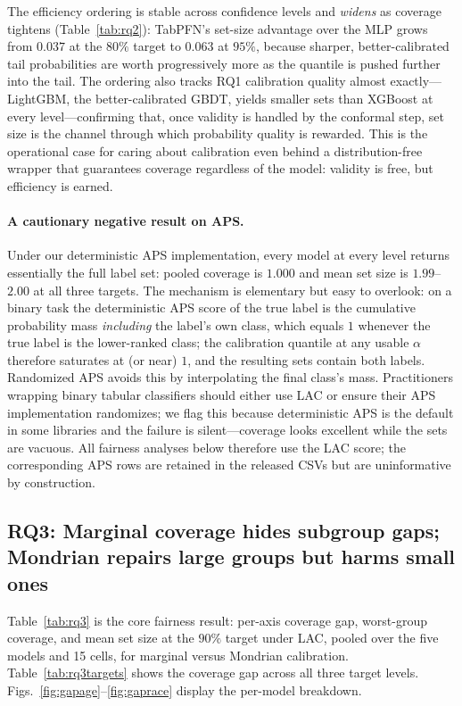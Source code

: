 \documentclass[review,12pt]{elsarticle}
\begin{document}
The efficiency ordering is stable across confidence levels and \emph{widens} as coverage tightens (Table~\ref{tab:rq2}): TabPFN's set-size advantage over the MLP grows from $0.037$ at the $80\%$ target to $0.063$ at $95\%$, because sharper, better-calibrated tail probabilities are worth progressively more as the quantile is pushed further into the tail. The ordering also tracks RQ1 calibration quality almost exactly---LightGBM, the better-calibrated GBDT, yields smaller sets than XGBoost at every level---confirming that, once validity is handled by the conformal step, set size is the channel through which probability quality is rewarded. This is the operational case for caring about calibration even behind a distribution-free wrapper that guarantees coverage regardless of the model: validity is free, but efficiency is earned.

\paragraph{A cautionary negative result on APS.}
Under our deterministic APS implementation, every model at every level returns essentially the full label set: pooled coverage is $1.000$ and mean set size is $1.99$--$2.00$ at all three targets. The mechanism is elementary but easy to overlook: on a binary task the deterministic APS score of the true label is the cumulative probability mass \emph{including} the label's own class, which equals $1$ whenever the true label is the lower-ranked class; the calibration quantile at any usable $\alpha$ therefore saturates at (or near) $1$, and the resulting sets contain both labels. Randomized APS \cite{romano2020aps} avoids this by interpolating the final class's mass. Practitioners wrapping binary tabular classifiers should either use LAC or ensure their APS implementation randomizes; we flag this because deterministic APS is the default in some libraries and the failure is silent---coverage looks excellent while the sets are vacuous. All fairness analyses below therefore use the LAC score; the corresponding APS rows are retained in the released CSVs but are uninformative by construction.

\subsection{RQ3: Marginal coverage hides subgroup gaps; Mondrian repairs large groups but harms small ones}
\label{sec:rq3}

Table~\ref{tab:rq3} is the core fairness result: per-axis coverage gap, worst-group coverage, and mean set size at the $90\%$ target under LAC, pooled over the five models and 15 cells, for marginal versus Mondrian calibration. Table~\ref{tab:rq3targets} shows the coverage gap across all three target levels. Figs.~\ref{fig:gapage}--\ref{fig:gaprace} display the per-model breakdown.
\end{document}
